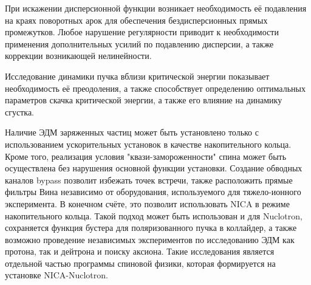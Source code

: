 \par При искажении дисперсионной функции возникает необходимость её подавления на краях поворотных арок для обеспечения бездисперсионных прямых промежутков. Любое нарушение регулярности приводит к необходимости применения дополнительных усилий по подавлению дисперсии, а также коррекции возникающей нелинейности.

\par Исследование динамики пучка вблизи критической энергии показывает необходимость её преодоления, а также  способствует определению оптимальных параметров скачка критической энергии, а также его влияние на динамику сгустка.

\par Наличие ЭДМ заряженных частиц может быть установлено только с использованием ускорительных установок в качестве накопительного кольца. Кроме того, реализация условия "квази-замороженности" спина может быть осуществлена без нарушения основной функции установки. Создание обводных каналов bypass позволит избежать точек встречи, также расположить прямые фильтры Вина независимо от оборудования, используемого для тяжело-ионного эксперимента. В конечном счёте, это позволит использовать NICA в режиме накопительного кольца. Такой подход может быть использован и для Nuclotron, сохраняется функция бустера для поляризованного пучка в коллайдер, а также возможно проведение независимых экспериментов по исследованию ЭДМ как протона, так и дейтрона и поиску аксиона. Такие исследования является отдельной частью программы спиновой физики, которая формируется на установке NICA-Nuclotron.

